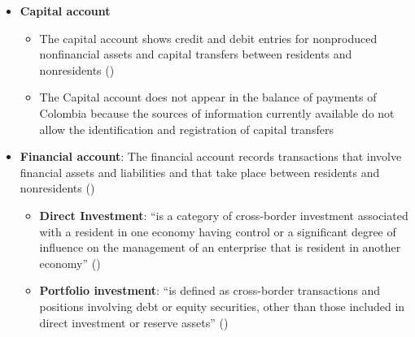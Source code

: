 \documentclass[
  ignorenonframetext,
]{beamer}
\providecommand{\tightlist}{%
  \setlength{\itemsep}{0pt}\setlength{\parskip}{0pt}}\usepackage{longtable,booktabs,array}
\begin{document}
\begin{frame}{}
\label{section-8}
\begin{itemize}
\item
  \textbf{Capital account}

  \begin{itemize}
  \item
    The capital account shows credit and debit entries for nonproduced
    nonfinancial assets and capital transfers between residents and
    nonresidents
    ()
  \item
    The Capital account does not appear in the balance of payments of
    Colombia because the sources of information currently available do
    not allow the identification and registration of capital transfers
  \end{itemize}
\end{itemize}
\end{frame}

\begin{frame}{}
\label{section-9}
\begin{itemize}
\item
  \textbf{Financial account}: The financial account records transactions
  that involve financial assets and liabilities and that take place
  between residents and nonresidents
  ()

  \begin{itemize}
  \tightlist
  \item
    \textbf{Direct Investment}: ``is a category of cross-border
    investment associated with a resident in one economy having control
    or a significant degree of influence on the management of an
    enterprise that is resident in another economy''
    ()
  \item
    \textbf{Portfolio investment}: ``is defined as cross-border
    transactions and positions involving debt or equity securities,
    other than those included in direct investment or reserve assets''
    ()
  \end{itemize}
\end{itemize}
\end{frame}
\end{document}

